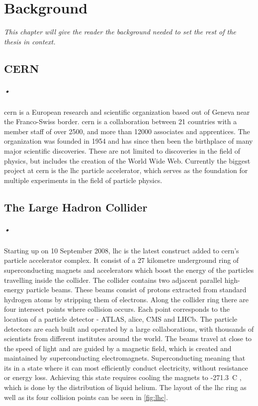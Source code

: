 \documentclass[a4paper]{report}
\begin{document}
\chapter{Background}
\textit{This chapter will give the reader the background needed to set the rest of the thesis in context.}

\section{CERN}
\paragraph{•}
\gls{cern} is a European research and scientific organization based out of Geneva near the Franco-Swiss border.\cite{cern}
\gls{cern} is a collaboration between 21 countries with a member staff of over 2500, and more than 12000 associates and apprentices.
The organization was founded in 1954 and has since then been the birthplace of many major scientific discoveries.
These are not limited to discoveries in the field of physics, but includes the creation of the World Wide Web.\cite{www}
Currently the biggest project at \gls{cern} is the \gls{lhc} particle accelerator, which serves as the foundation for multiple experiments in the field of particle physics.

\section{The Large Hadron Collider}
\label{sec:lhc}
\paragraph{•}
Starting up on 10 September 2008, \gls{lhc} is the latest construct added to \gls{cern}'s particle accelerator complex.\cite{lhc}
It consist of a 27 kilometre underground ring of superconducting magnets and accelerators which boost the energy of the particles travelling inside the collider.
The collider contains two adjacent parallel high-energy particle beams.
These beams consist of protons extracted from standard hydrogen atoms by stripping them of electrons.
Along the collider ring there are four intersect points where collision occurs.
Each point corresponds to the location of a particle detector - ATLAS, \gls{alice}, CMS and LHCb. 
The particle detectors are each built and operated by a large collaborations, with thousands of scientists from different institutes around the world.
The beams travel at close to the speed of light and are guided by a magnetic field, which is created and maintained by superconducting electromagnets.
Superconducting meaning that its in a state where it can most efficiently conduct electricity, without resistance or energy loss.
Achieving this state requires cooling the magnets to -271.3\degree~C , which is done by the distribution of liquid helium. 
The layout of the \gls{lhc} ring as well as its four collision points can be seen in \ref{fig:lhc}.
\end{document}
